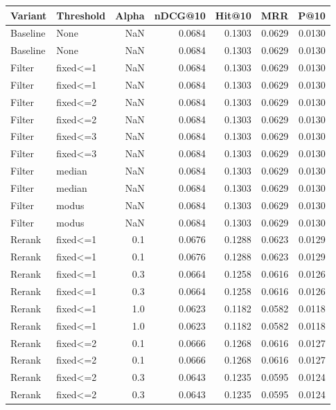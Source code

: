 \begin{tabular}{llrrrrr}
\toprule
 Variant & Threshold &  Alpha &  nDCG@10 &  Hit@10 &    MRR &   P@10 \\
\midrule
Baseline &      None &    NaN &   0.0684 &  0.1303 & 0.0629 & 0.0130 \\
Baseline &      None &    NaN &   0.0684 &  0.1303 & 0.0629 & 0.0130 \\
  Filter &  fixed<=1 &    NaN &   0.0684 &  0.1303 & 0.0629 & 0.0130 \\
  Filter &  fixed<=1 &    NaN &   0.0684 &  0.1303 & 0.0629 & 0.0130 \\
  Filter &  fixed<=2 &    NaN &   0.0684 &  0.1303 & 0.0629 & 0.0130 \\
  Filter &  fixed<=2 &    NaN &   0.0684 &  0.1303 & 0.0629 & 0.0130 \\
  Filter &  fixed<=3 &    NaN &   0.0684 &  0.1303 & 0.0629 & 0.0130 \\
  Filter &  fixed<=3 &    NaN &   0.0684 &  0.1303 & 0.0629 & 0.0130 \\
  Filter &    median &    NaN &   0.0684 &  0.1303 & 0.0629 & 0.0130 \\
  Filter &    median &    NaN &   0.0684 &  0.1303 & 0.0629 & 0.0130 \\
  Filter &     modus &    NaN &   0.0684 &  0.1303 & 0.0629 & 0.0130 \\
  Filter &     modus &    NaN &   0.0684 &  0.1303 & 0.0629 & 0.0130 \\
  Rerank &  fixed<=1 &    0.1 &   0.0676 &  0.1288 & 0.0623 & 0.0129 \\
  Rerank &  fixed<=1 &    0.1 &   0.0676 &  0.1288 & 0.0623 & 0.0129 \\
  Rerank &  fixed<=1 &    0.3 &   0.0664 &  0.1258 & 0.0616 & 0.0126 \\
  Rerank &  fixed<=1 &    0.3 &   0.0664 &  0.1258 & 0.0616 & 0.0126 \\
  Rerank &  fixed<=1 &    1.0 &   0.0623 &  0.1182 & 0.0582 & 0.0118 \\
  Rerank &  fixed<=1 &    1.0 &   0.0623 &  0.1182 & 0.0582 & 0.0118 \\
  Rerank &  fixed<=2 &    0.1 &   0.0666 &  0.1268 & 0.0616 & 0.0127 \\
  Rerank &  fixed<=2 &    0.1 &   0.0666 &  0.1268 & 0.0616 & 0.0127 \\
  Rerank &  fixed<=2 &    0.3 &   0.0643 &  0.1235 & 0.0595 & 0.0124 \\
  Rerank &  fixed<=2 &    0.3 &   0.0643 &  0.1235 & 0.0595 & 0.0124 \\

\end{tabular}
